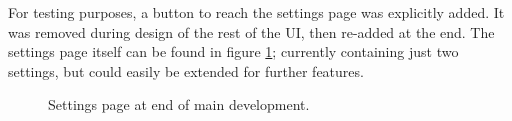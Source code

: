 \documentclass[11pt, a4paper, notitlepage]{report}
\begin{document}
For testing purposes, a button to reach the settings page was explicitly added. It was removed during design of the rest of the UI, then re-added at the end. The settings page itself can be found in figure \ref{fig:settingsPage}; currently containing just two settings, but could easily be extended for further features.

\begin{figure}
	\centering
	\caption{Settings page at end of main development.}
	\label{fig:settingsPage}
\end{figure}
\pagebreak
\end{document}
